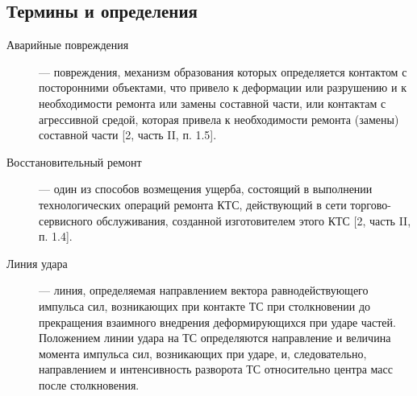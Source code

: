 \subsection{Термины и определения}
\begin{description}
%	


	\item[Аварийные повреждения] --- повреждения, механизм образования которых определяется контактом с посторонними объектами, что привело к деформации или разрушению и к необходимости ремонта или замены составной части, или контактам с агрессивной средой, которая привела к необходимости ремонта (замены) составной части [2, часть II, п. 1.5].
	
\item[Восстановительный ремонт]--- один из способов возмещения ущерба, состоящий в выполнении технологических операций ремонта КТС, действующий в сети торгово-сервисного обслуживания, созданной изготовителем этого КТС [2, часть II, п. 1.4].

\item[Линия удара]--- линия, определяемая направлением вектора равнодействующего импульса сил, возникающих при контакте ТС при столкновении до прекращения взаимного внедрения деформирующихся при ударе частей. Положением линии удара на ТС определяются направление и величина момента импульса сил, возникающих при ударе, и, следовательно, направлением и интенсивность разворота ТС относительно центра масс после столкновения.  


\end{description}
